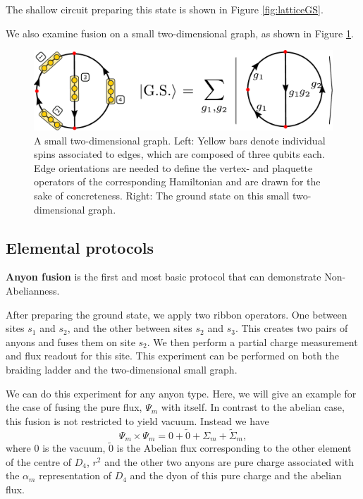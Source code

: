 \documentclass[two column]{article}
\begin{document}
The shallow circuit preparing this state is shown in Figure \ref{fig:latticeGS}.

We also examine fusion on a small two-dimensional graph, as shown in Figure \ref{fig:basketball}.

\begin{figure}
    \centering
    \includegraphics[width=\linewidth]{Figures/basketball.pdf}
    \caption{A small two-dimensional graph. Left: Yellow bars denote individual spins associated to edges, which are composed of three qubits each. Edge orientations are needed to define the vertex- and plaquette operators of the corresponding Hamiltonian and are drawn for the sake of concreteness. Right: The ground state on this small two-dimensional graph.}
    \label{fig:basketball}
\end{figure}




\subsection{Elemental protocols}
\textbf{Anyon fusion}
is the first and most basic protocol that can demonstrate Non-Abelianness. 

After preparing the ground state, we apply two ribbon operators. One between sites $s_1$ and $s_2$, and the other between sites $s_2$ and $s_3$.
This creates two pairs of anyons and fuses them on site $s_2$. We then perform a partial charge measurement and flux readout for this site.
This experiment can be performed on both the braiding ladder and the two-dimensional small graph.

We can do this experiment for any anyon type. Here, we will give an example for the case of fusing the pure flux, $\Psi_m$ with itself. In contrast to the abelian case, this fusion is not restricted to yield vacuum. Instead we have
$$\Psi_m \times \Psi_m = 0 + \tilde{0} + \Sigma_m + \tilde{\Sigma}_m,$$ where $0$ is the vacuum, $\tilde{0}$ is the Abelian flux corresponding to the other element of the centre of $D_4$, $r^2$ and the other two anyons are pure charge associated with the $\alpha_m$ representation of $D_4$ and the dyon of this pure charge and the abelian flux.
\end{document}
